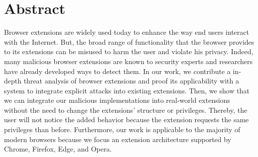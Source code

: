 \documentclass[parskip=full,bigchapter,linedtoc,colorback,accentcolor=tud9c,type=bsc]{tudthesis}
\begin{document}
	
	\author{Arno Manfred Krause}
	\makethesistitle
	
	
	\section*{Abstract}
	
	Browser extensions are widely used today to enhance the way end users interact with the Internet. But, the broad range of functionality that the browser provides to its extensions can be misused to harm the user and violate his privacy. Indeed, many malicious browser extensions are known to security experts and researchers have already developed ways to detect them. In our work, we contribute a in-depth threat analysis of browser extensions and proof its applicability with a system to integrate explicit attacks into existing extensions. Then, we show that we can integrate our malicious implementations into real-world extensions without the need to change the extensions' structure or privileges. Thereby, the user will not notice the added behavior because the extension requests the same privileges than before. Furthermore, our work is applicable to the majority of modern browsers because we focus an extension architecture supported by Chrome, Firefox, Edge, and Opera.
	
	
	\tableofcontents
	\newpage
	
	
	
	
	
	
	
	
	
	
	
	
	
	
	
	
	
	
	
	
%
%
%
%
%


	\appendix
	
	
	
\end{document}
